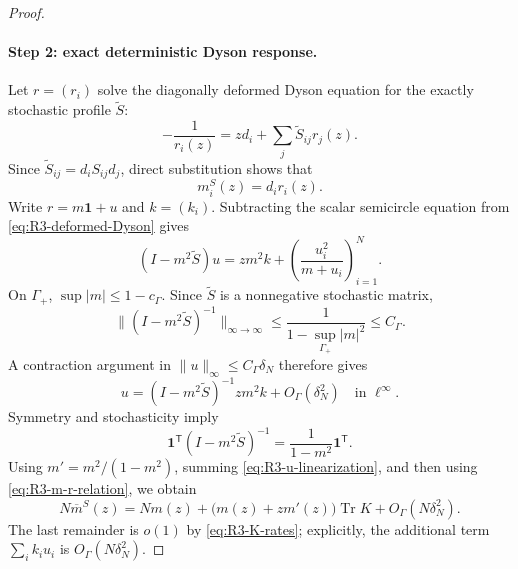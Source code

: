 \documentclass[10pt,a4paper]{amsart}
\newcommand{\Tr}{\operatorname{Tr}}
\newcommand{\one}{\mathbf 1}
\newcommand{\norm}[1]{\lVert #1\rVert}
\begin{document}
\begin{proof}
\paragraph{Step 2: exact deterministic Dyson response.}
Let \(r=(r_i)\) solve the diagonally deformed Dyson equation for the exactly
stochastic profile \(\widetilde S\):
\begin{equation}\label{eq:R3-deformed-Dyson}
 -\frac1{r_i(z)}=zd_i+\sum_j\widetilde S_{ij}r_j(z).
\end{equation}
Since \(\widetilde S_{ij}=d_iS_{ij}d_j\), direct substitution shows that
\begin{equation}\label{eq:R3-m-r-relation}
 m_i^S(z)=d_i r_i(z).
\end{equation}
Write \(r=m\one+u\) and \(k=(k_i)\).  Subtracting the scalar semicircle
equation from \eqref{eq:R3-deformed-Dyson} gives
\begin{equation}\label{eq:R3-u-equation}
 (I-m^2\widetilde S)u
 =zm^2k+\left(\frac{u_i^2}{m+u_i}\right)_{i=1}^N.
\end{equation}
On \(\Gamma_+\), \(\sup|m|\le1-c_\Gamma\).  Since \(\widetilde S\) is a
nonnegative stochastic matrix,
\begin{equation}\label{eq:R3-scalar-stability}
 \norm{(I-m^2\widetilde S)^{-1}}_{\infty\to\infty}
 \le\frac1{1-\sup_{\Gamma_+}|m|^2}\le C_\Gamma.
\end{equation}
A contraction argument in \(\norm{u}_\infty\le C_\Gamma\delta_N\) therefore
gives
\begin{equation}\label{eq:R3-u-linearization}
 u=(I-m^2\widetilde S)^{-1}zm^2k+O_\Gamma(\delta_N^2)
 \quad\text{in }\ell^\infty.
\end{equation}
Symmetry and stochasticity imply
\[
 \one^{\mathsf T}(I-m^2\widetilde S)^{-1}
 =\frac1{1-m^2}\one^{\mathsf T}.
\]
Using \(m'=m^2/(1-m^2)\), summing
\eqref{eq:R3-u-linearization}, and then using
\eqref{eq:R3-m-r-relation}, we obtain
\begin{equation}\label{eq:R3-deterministic-congruence-expansion}
 N\overline m^S(z)
 =Nm(z)+\bigl(m(z)+zm'(z)\bigr)\Tr K
 +O_\Gamma(N\delta_N^2).
\end{equation}
The last remainder is \(o(1)\) by \eqref{eq:R3-K-rates}; explicitly,
the additional term \(\sum_i k_iu_i\) is
\(O_\Gamma(N\delta_N^2)\).


\end{proof}
\end{document}
